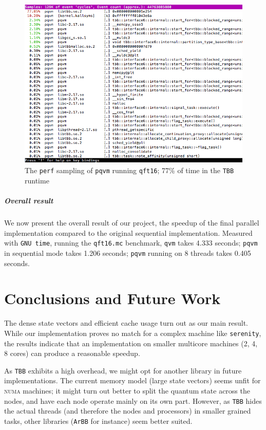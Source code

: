 \documentclass[a4paper,11pt, oneside]{report}
\newcommand{\code}[1]{\texttt{#1}}
\newcommand{\acro}[1]{\textsc{#1}}
\begin{document}
\begin{figure}[hbp]
	\centering
	\includegraphics[width=\columnwidth]{perf-pqvm.png}
	\caption{The \code{perf} sampling of \code{pqvm} running \code{qft16}; 77\% of time in the \code{TBB} runtime}\label{fig:perf-pqvm}
\end{figure}

\paragraph{Overall result} We now present the overall result of our project, the speedup of the final parallel implementation compared to the original sequential implementation. Measured with \code{GNU time}, running the \code{qft16.mc} benchmark, \code{qvm} takes 4.333 seconds; \code{pqvm} in sequential mode takes 1.206 seconds; \code{pqvm} running on 8 threads takes 0.405 seconds.

\chapter{Conclusions and Future Work}
The dense state vectors and efficient cache usage turn out as our main result. While our implementation proves no match for a complex machine like \code{serenity}, the results indicate that an implementation on smaller multicore machines (2, 4, 8 cores) can produce a reasonable speedup.

As \code{TBB} exhibits a high overhead, we might opt for another library in future implementations. The current memory model (large state vectors) seems unfit for \acro{numa} machines; it might turn out better to split the quantum state across the nodes, and have each node operate mainly on its own part. However, as \code{TBB} hides the actual threads (and therefore the nodes and processors) in smaller grained tasks, other libraries (\code{ArBB} for instance) seem better suited.
\end{document}
